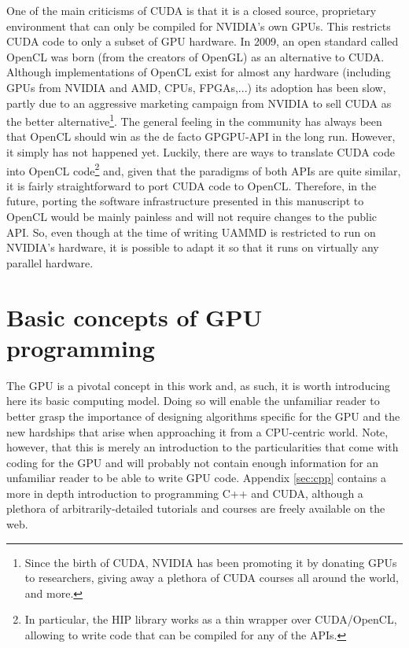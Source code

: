 \documentclass[twoside,openright,titlepage,numbers=noenddot,%
headinclude,footinclude,cleardoublepage=empty,abstract=on,
BCOR=5mm,fontsize=11pt, dvipsnames, paper=b5
]{scrreprt}
\newcommand{\uammd}{\gls{UAMMD}\xspace}
\newcommand{\gpu}{\gls{GPU}\xspace}
\begin{document}
One of the main criticisms of CUDA is that it is a closed source, proprietary environment that can only be compiled for NVIDIA's own \glspl{GPU}. This restricts CUDA code to only a subset of \gpu hardware.
In 2009, an open standard called OpenCL\cite{Stone2010} was born (from the creators of OpenGL) as an alternative to CUDA. Although implementations of OpenCL exist for almost any hardware (including GPUs from NVIDIA and AMD, CPUs, FPGAs,...) its adoption has been slow, partly due to an aggressive marketing campaign from NVIDIA to sell CUDA as the better alternative\footnote{Since the birth of CUDA, NVIDIA has been promoting it by donating GPUs to researchers, giving away a plethora of CUDA courses all around the world, and more.}. The general feeling in the community has always been that OpenCL should win as the de facto \gls{GPGPU}-\gls{API} in the long run. However, it simply has not happened yet.
Luckily, there are ways to translate CUDA code into OpenCL code\footnote{In particular, the HIP library works as a thin wrapper over CUDA/OpenCL, allowing to write code that can be compiled for any of the \glspl{API}.} and, given that the paradigms of both \glspl{API} are quite similar, it is fairly straightforward to port CUDA code to OpenCL. Therefore, in the future, porting the software infrastructure presented in this manuscript to OpenCL would be mainly painless and will not require changes to the public \gls{API}. So, even though at the time of writing \uammd is restricted to run on NVIDIA's hardware, it is possible to adapt it so that it runs on virtually any parallel hardware.

\section{Basic concepts of GPU programming}\label{ch:gpuintroduction}
The \gpu is a pivotal concept in this work and, as such, it is worth introducing here its basic computing model. Doing so will enable the unfamiliar reader to better grasp the importance of designing algorithms specific for the \gpu and the new hardships that arise when approaching it from a CPU-centric world. Note, however, that this is merely an introduction to the particularities that come with coding for the \gpu and will probably not contain enough information for an unfamiliar reader to be able to write \gpu code. Appendix \ref{sec:cpp} contains a more in depth introduction to programming C++ and CUDA, although a plethora of arbitrarily-detailed tutorials and courses are freely available on the web.
\end{document}
